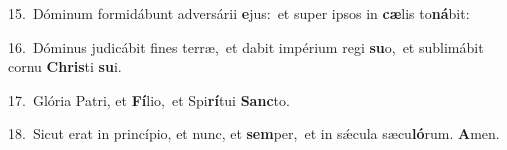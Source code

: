 {\numbfont\textcolor{\numbcolor}{15.}}~Dóminum formidábunt adversárii \textbf{e}\-jus:~\star et super ipsos in \textbf{cæ}\-lis to\-\textbf{ná}\-bit:\par
{\numbfont\textcolor{\numbcolor}{16.}}~Dóminus judicábit fines terræ,~\dagger et dabit impérium regi \textbf{su}\-o,~\star et sublimábit cornu \textbf{Chris}\-ti \textbf{su}\-i.\par
{\numbfont\textcolor{\numbcolor}{17.}}~Glória Patri, et \textbf{Fí}\-lio,~\star et Spi\-\textbf{rí}\-tui \textbf{Sanc}\-to.\par
{\numbfont\textcolor{\numbcolor}{18.}}~Sicut erat in princípio, et nunc, et \textbf{sem}\-per,~\star et in sǽcula sæcu\-\textbf{ló}\-rum. \textbf{A}\-men.\par
